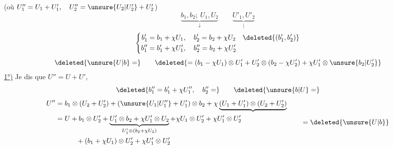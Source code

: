 (où \(U''_1=U_1+U'_1,\quad U''_2=\unsure{U_2|U'_2}+U'_2\))
\[
\underbrace{b_1,b_2;\ U_1,U_2}_{\downarrow}\qquad
\underbrace{U'_1,U'_2}_{|}
\]
\[
\left\{\begin{aligned}
b'_1&=b_1+\chi U_1,\quad b'_2=b_2+\chi U_2\quad\deleted{(b'_1,b'_2)}\\
b''_1&=b'_1+\chi U'_1,\quad b''_2=b_2+\chi U'_2
\end{aligned}\right.
\]
\[
\deleted{\unsure{U|b}=}\qquad
\deleted{=(b_1-\chi U_1)\otimes U'_1+U'_2\otimes(b_2-\chi U'_2)+\chi U'_1\otimes\unsure{b_2|U'_2}}
\]
\uline{1°)} Je dis que \(U''=U+U'\),
\[
\deleted{b''_1=b'_1+\chi U''_1,\quad b''_2=}\qquad\deleted{\unsure{b|U}=}
\]
\[
\begin{aligned}
U''&=b_1\otimes(U_2+U'_2)+(\unsure{U_1|U''_1}+U'_1)\otimes b_2
+\chi\underbrace{(U_1+U'_1)\otimes(U_2+U'_2)}\\
&=U+b_1\otimes U'_2+\underbrace{U'_1\otimes b_2+\chi U'_1\otimes U_2}_{U'_1\otimes(b_2+\chi U_2)}
+\chi U_1\otimes U'_2+\chi U'_1\otimes U'_2\\
&\hspace{3em}{}+(b_1+\chi U_1)\otimes U'_2+\chi U'_1\otimes U'_2
\end{aligned}
\qquad=\deleted{\unsure{U|b}}
\]
